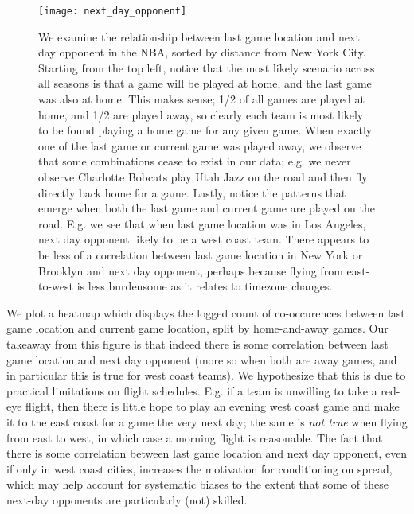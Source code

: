 \documentclass[letterpaper,12pt]{article}
\begin{document}
\begin{figure}
  \centering
  \label{fig: next day opponent}
  \texttt{[image: next\_day\_opponent]}
  \caption{We examine the relationship between last game location and next day opponent in the NBA, sorted by distance from New York City. 
Starting from the top left, notice that the most likely scenario across all seasons is that a game will be played at home, and the last game was also at home. This makes sense; 1/2 of all games are played at home, and 1/2 are played away, so clearly each team is most likely to be found playing a home game for any given game. When exactly one of the last game or current game was played away,
we observe that some combinations cease to exist in our data; e.g. we never observe Charlotte Bobcats play Utah Jazz on the road and then fly directly back home for a game. Lastly, notice the patterns that emerge when both the last game and current game are played on the road. E.g. we see that when last game location was in Los Angeles, next day opponent likely to be a west coast team. There appears to be less of a correlation between last game location in New York or Brooklyn and next day opponent, perhaps because flying from east-to-west
is less burdensome as it relates to timezone changes.} 
\end{figure}

We plot a heatmap which displays the logged count of co-occurences between last game
location and current game location, split by home-and-away games.
Our takeaway from this figure is that indeed there is some correlation between last game location
and next day opponent (more so when both are away games,  
and in particular this is true for west coast teams). We hypothesize that
this is due to practical limitations on flight schedules. E.g. if a team is unwilling to take a red-eye
flight, then there is little hope to play an evening west coast game and make it to the east coast for a game the very next day;
the same is \emph{not true} when flying from east to west, in which case a morning flight is reasonable.
The fact that there is some correlation between last game location and next day opponent, even if only in west coast cities, increases the motivation for conditioning on spread, which may help account for systematic biases to the extent that some of these next-day opponents are particularly (not) skilled. 
\end{document}
